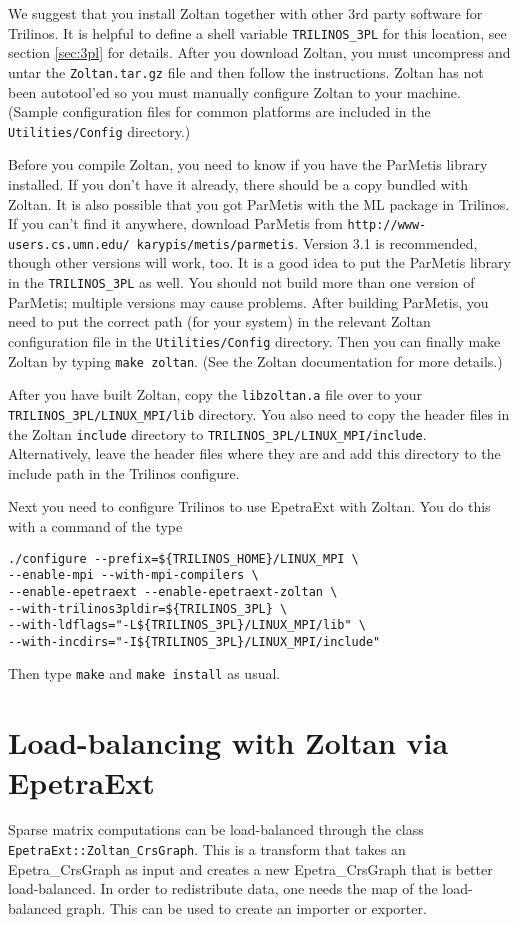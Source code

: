 We suggest that you install Zoltan together with other 3rd party software 
for Trilinos. It is helpful to define a shell variable \verb!TRILINOS_3PL! 
for this location, see section \ref{sec:3pl} for details. After 
you download Zoltan, you must uncompress and untar the
\verb!Zoltan.tar.gz! file and then follow the instructions. 
Zoltan has not been autotool'ed so you must manually configure
Zoltan to your machine. (Sample configuration files for common
platforms are included in the \verb!Utilities/Config! directory.) 

Before you compile Zoltan, you need to know if you have the ParMetis 
library installed.
If you don't have it already, there should be a copy bundled
with Zoltan. It is also possible that you got ParMetis with
the ML package in Trilinos. If you can't find it anywhere, 
download ParMetis from \texttt{http://www-users.cs.umn.edu/~karypis/metis/parmetis}. Version 3.1 is recommended, though other versions will work, too.
It is a good idea to put the ParMetis library in the \verb!TRILINOS_3PL!
as well. You should not build more than one version of ParMetis; multiple versions may cause problems. After building ParMetis, you need to put
the correct path (for your system) in the relevant Zoltan configuration file
in the \verb!Utilities/Config! directory. Then you can finally make Zoltan
by typing \verb!make zoltan!. (See the Zoltan documentation for more details.)

After you have built Zoltan, copy the \verb!libzoltan.a! file over to
your \verb!TRILINOS_3PL/LINUX_MPI/lib! directory. You also
need to copy the header files in the Zoltan \verb!include! directory
to \verb!TRILINOS_3PL/LINUX_MPI/include!. 
Alternatively, leave the header files where they are and add this
directory to the include path in the Trilinos configure.

Next you need to configure Trilinos to use EpetraExt with Zoltan.
You do this with a command of the type
\begin{verbatim}
./configure --prefix=${TRILINOS_HOME}/LINUX_MPI \
--enable-mpi --with-mpi-compilers \
--enable-epetraext --enable-epetraext-zoltan \
--with-trilinos3pldir=${TRILINOS_3PL} \
--with-ldflags="-L${TRILINOS_3PL}/LINUX_MPI/lib" \
--with-incdirs="-I${TRILINOS_3PL}/LINUX_MPI/include"
\end{verbatim}

Then type \verb!make! and \verb!make install! as usual.

\section{Load-balancing with Zoltan via EpetraExt}
Sparse matrix computations can be load-balanced through
the class \verb!EpetraExt::Zoltan_CrsGraph!. This is
a transform that takes an Epetra\_CrsGraph as input
and creates a new Epetra\_CrsGraph that is better load-balanced.
In order to redistribute data, one needs the map of the load-balanced
graph. This can be used to create an importer or exporter. 

